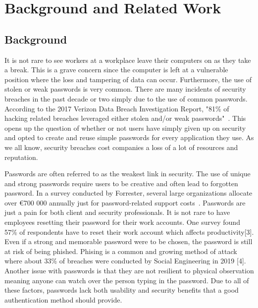 \documentclass[letterpaper,twocolumn,10pt]{article}
\begin{document}

\section{Background and Related Work}  

\subsection{Background}

It is not rare to see workers at a workplace leave their computers on as they take a break. This is a grave concern since the computer is left at a vulnerable position where the loss and tampering of data can occur. Furthermore, the use of stolen or weak passwords is very common. There are many incidents of security breaches in the past decade or two simply due to the use of common passwords. According to the 2017 Verizon Data Breach Investigation Report, "81\% of hacking related breaches leveraged either stolen and/or weak passwords"~\cite{verizon_breach}. This opens up the question of whether or not users have simply given up on security and opted to create and reuse simple passwords for every application they use. As we all know, security breaches cost companies a loss of a lot of resources and reputation.

Passwords are often referred to as the weakest link in security. The use of unique and strong passwords require users to be creative and often lead to forgotten password. In a survey conducted by Forrester, several large organizations allocate over \euro{700 000} annually just for password-related support costs~\cite{password_cost}. Passwords are just a pain for both client and security professionals. It is not rare to have employees resetting their password for their work accounts. One survey found 57\% of respondents have to reset their work account which affects productivity[3]. Even if a strong and memorable password were to be chosen, the password is still at risk of being phished. Phising is a common and growing method of attack where about 33\% of breaches were conducted by Social Engineering in 2019 [4]. Another issue with passwords is that they are not resilient to physical observation meaning anyone can watch over the person typing in the password. Due to all of these factors, passwords lack both usability and security benefits that a good authentication method should provide.
\end{document}
